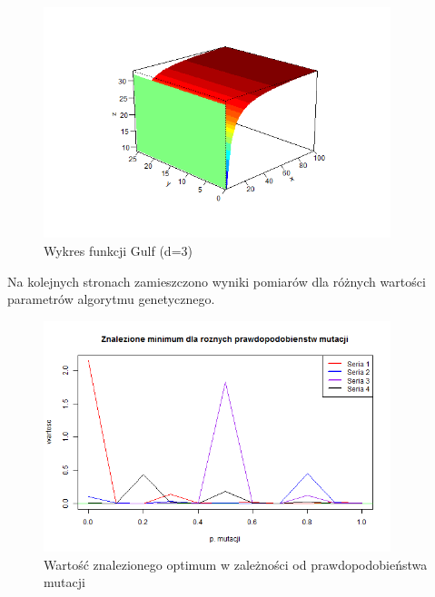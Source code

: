 \documentclass[11pt, a4paper]{article}
\newcommand{\fbi}{\leavevmode{\parindent=1em\indent}}
\begin{document}
\begin{figure}[H]
	\begin{center}
		\includegraphics[width=0.9\textwidth]{./assets/Gulf1.png} %
		\caption{Wykres funkcji Gulf (d=3)}
		\label{fig:gulf1}
	\end{center}
\end{figure}

\fbi
Na kolejnych stronach zamieszczono wyniki pomiarów dla różnych wartości parametrów algorytmu genetycznego.

\begin{figure}[H]
	\begin{center}
		\includegraphics[width=0.9\textwidth]{./assets/Gulf2.png} %
		\caption{Wartość znalezionego optimum w zależności od prawdopodobieństwa mutacji}
		\label{fig:gulf2}
	\end{center}
\end{figure}
\end{document}
